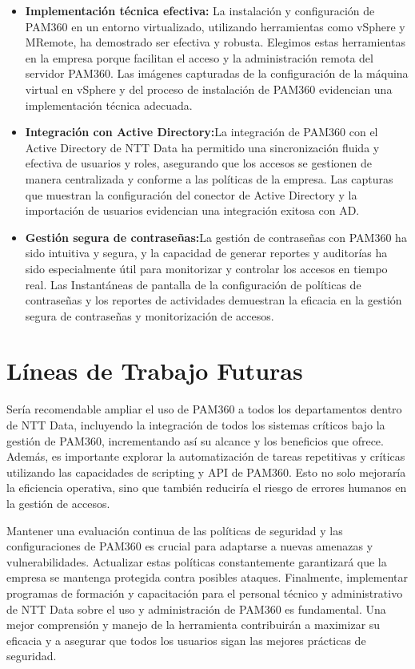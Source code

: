 \begin{itemize}
	
	\item \textbf{Implementación técnica efectiva:} La instalación y configuración de PAM360 en un entorno virtualizado, utilizando herramientas como vSphere y MRemote, ha demostrado ser efectiva y robusta. Elegimos estas herramientas en la empresa porque facilitan el acceso y la administración remota del servidor PAM360. Las imágenes capturadas de la configuración de la máquina virtual en vSphere y del proceso de instalación de PAM360 evidencian una implementación técnica adecuada.

	
	\item \textbf{Integración con Active Directory:}La integración de PAM360 con el Active Directory de NTT Data ha permitido una sincronización fluida y efectiva de usuarios y roles, asegurando que los accesos se gestionen de manera centralizada y conforme a las políticas de la empresa. Las capturas que muestran la configuración del conector de Active Directory y la importación de usuarios evidencian
	una integración exitosa con AD.
	
	
	\item \textbf{Gestión segura de contraseñas:}La gestión de contraseñas con PAM360 ha sido intuitiva y segura, y la capacidad de generar reportes y auditorías ha sido especialmente útil para monitorizar y controlar los accesos en tiempo real. Las Instantáneas de pantalla de la configuración de políticas de contraseñas y los reportes de actividades demuestran la eficacia en la gestión segura de contraseñas y monitorización de accesos.  

\end{itemize}

\section{Líneas de Trabajo Futuras}

Sería recomendable ampliar el uso de PAM360 a todos los departamentos dentro de NTT Data, incluyendo la integración de todos los sistemas críticos bajo la gestión de PAM360, incrementando así su alcance y los beneficios que ofrece. Además, es importante explorar la automatización de tareas repetitivas y críticas utilizando las capacidades de scripting y API de PAM360. Esto no solo mejoraría la eficiencia operativa, sino que también reduciría el riesgo de errores humanos en la gestión de accesos.

Mantener una evaluación continua de las políticas de seguridad y las configuraciones de PAM360 es crucial para adaptarse a nuevas amenazas y vulnerabilidades. Actualizar estas políticas constantemente garantizará que la empresa se mantenga protegida contra posibles ataques. Finalmente, implementar programas de formación y capacitación para el personal técnico y administrativo de NTT Data sobre el uso y administración de PAM360 es fundamental. Una mejor comprensión y manejo de la herramienta contribuirán a maximizar su eficacia y a asegurar que todos los usuarios sigan las mejores prácticas de seguridad.

